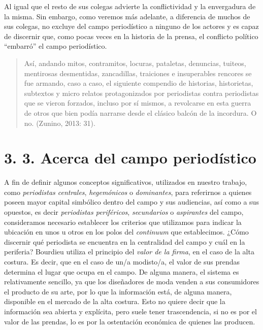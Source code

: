 Al igual que el resto de sus colegas advierte la conflictividad y la envergadura de la misma. Sin embargo, como veremos más adelante, a diferencia de muchos de sus colegas, no excluye del campo periodístico a ninguno de los actores y es capaz de discernir que, como pocas veces en la historia de la prensa, el conflicto político ``embarró'' el campo periodístico.

\begin{quote}
Así, andando mitos, contramitos, locuras, pataletas, denuncias, tuiteos, mentirosas desmentidas, zancadillas, traiciones e insuperables rencores se fue armando, caso a caso, el siguiente compendio de historias, historietas, subtextos y micro relatos protagonizados por periodistas contra periodistas que se vieron forzados, incluso por sí mismos, a revolcarse en esta guerra de otros que bien podía narrarse desde el clásico balcón de la incordura. O no. (Zunino, 2013: 31).
\end{quote}


\section{3. 3. Acerca del campo periodístico}

A fin de definir algunos conceptos significativos, utilizados en nuestro trabajo, como \emph{periodistas centrales}, \emph{hegemónicos} o \emph{dominantes}, para referirnos a quienes poseen mayor capital simbólico dentro del campo y sus audiencias, así como a sus opuestos, es decir \emph{periodistas periféricos}, \emph{secundarios} o \emph{aspirantes} del campo, consideramos necesario establecer los criterios que utilizamos para indicar la ubicación en unos u otros en los polos del \emph{continuum} que establecimos. ¿Cómo discernir qué periodista se encuentra en la centralidad del campo y cuál en la periferia? Bourdieu utiliza el principio del \emph{valor de la firma}, en el caso de la alta costura. Es decir, que en el caso de un/a modisto/a, el valor de sus prendas determina el lugar que ocupa en el campo. De alguna manera, el sistema es relativamente sencillo, ya que los diseñadores de moda venden a sus consumidores el producto de su arte, por lo que la información está, de alguna manera, disponible en el mercado de la alta costura. Esto no quiere decir que la información sea abierta y explícita, pero suele tener trascendencia, si no es por el valor de las prendas, lo es por la ostentación económica de quienes las producen.

